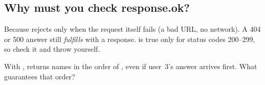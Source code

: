 \subsection{Why must you check response.ok?}%
Because  rejects only when the request itself fails (a bad URL, no network). A 404 or 500 answer still \emph{fulfills} with a response.  is true only for status codes 200--299, so check it and throw yourself.

\begin{ponder}With ,  returns names in the order of , even if user~3's answer arrives first. What guarantees that order?\end{ponder}
